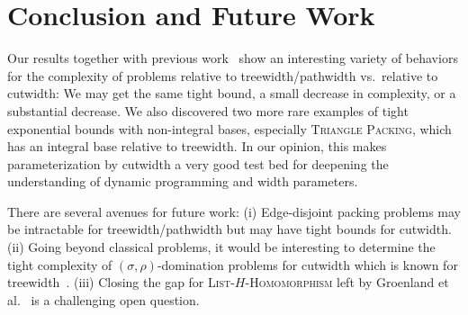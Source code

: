\documentclass[a4paper,UKenglish,cleveref, autoref, thm-restate]{lipics-v2021}
\begin{document}
 \section{Conclusion and Future Work}\label{sec:conclusion}

Our results together with previous work~\cite{DBLP:conf/stacs/BojikianCHK23,DBLP:journals/tcs/JansenN19} show an interesting variety of behaviors for the complexity of problems relative to treewidth/pathwidth vs.\ relative to cutwidth: We may get the same tight bound, a small decrease in complexity, or a substantial decrease. We also discovered two more rare examples of tight exponential bounds with non-integral bases, especially \textsc{Triangle Packing}, which has an integral base relative to treewidth. In our opinion, this makes parameterization by cutwidth a very good test bed for deepening the understanding of dynamic programming and width parameters.

There are several avenues for future work: (i) Edge-disjoint packing problems may be intractable for treewidth/pathwidth but may have tight bounds for cutwidth. (ii) Going beyond classical problems, it would be interesting to determine the tight complexity of $(\sigma, \rho)$-domination problems for cutwidth which is known for treewidth~\cite{DBLP:conf/soda/FockeMINSSW23}. (iii) Closing the gap for \textsc{List-$H$-Homomorphism} left by Groenland et al.~\cite{DBLP:conf/icalp/GroenlandMNPR24} is a challenging open question.


 

\end{document}
